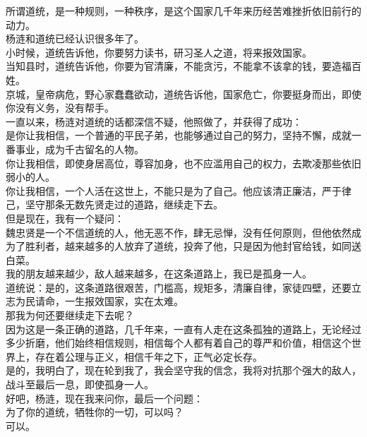 \begin{multicols}{\theparacolNo}
所谓道统，是一种规则，一种秩序，是这个国家几千年来历经苦难挫折依旧前行的动力。\\

杨涟和道统已经认识很多年了。\\

小时候，道统告诉他，你要努力读书，研习圣人之道，将来报效国家。\\

当知县时，道统告诉他，你要为官清廉，不能贪污，不能拿不该拿的钱，要造福百姓。\\

京城，皇帝病危，野心家蠢蠢欲动，道统告诉他，国家危亡，你要挺身而出，即使你没有义务，没有帮手。\\

一直以来，杨涟对道统的话都深信不疑，他照做了，并获得了成功：\\

是你让我相信，一个普通的平民子弟，也能够通过自己的努力，坚持不懈，成就一番事业，成为千古留名的人物。\\

你让我相信，即使身居高位，尊容加身，也不应滥用自己的权力，去欺凌那些依旧弱小的人。\\

你让我相信，一个人活在这世上，不能只是为了自己。他应该清正廉洁，严于律己，坚守那条无数先贤走过的道路，继续走下去。\\

但是现在，我有一个疑问：\\

魏忠贤是一个不信道统的人，他无恶不作，肆无忌惮，没有任何原则，但他依然成为了胜利者，越来越多的人放弃了道统，投奔了他，只是因为他封官给钱，如同送白菜。\\

我的朋友越来越少，敌人越来越多，在这条道路上，我已是孤身一人。\\

道统说：是的，这条道路很艰苦，门槛高，规矩多，清廉自律，家徒四壁，还要立志为民请命，一生报效国家，实在太难。\\

那我为何还要继续走下去呢？\\

因为这是一条正确的道路，几千年来，一直有人走在这条孤独的道路上，无论经过多少折磨，他们始终相信规则，相信每个人都有着自己的尊严和价值，相信这个世界上，存在着公理与正义，相信千年之下，正气必定长存。\\

是的，我明白了，现在轮到我了，我会坚守我的信念，我将对抗那个强大的敌人，战斗至最后一息，即使孤身一人。\\

好吧，杨涟，现在我来问你，最后一个问题：\\

为了你的道统，牺牲你的一切，可以吗？\\

可以。\\

\ifnum{}
	\end{multicols}
\fi
\newpage
